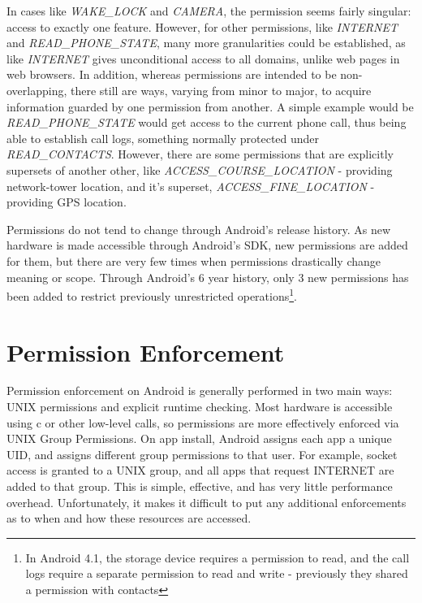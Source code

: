 In cases like \textit{WAKE\_LOCK} and \textit{CAMERA}, the permission seems fairly singular: access to exactly one feature. However, for other permissions, like \textit{INTERNET} and \textit{READ\_PHONE\_STATE}, many more granularities could be established, as like \textit{INTERNET} gives unconditional access to all domains, unlike web pages in web browsers. In addition, whereas permissions are intended to be non-overlapping, there still are ways, varying from minor to major, to acquire information guarded by one permission from another. A simple example would be \textit{READ\_PHONE\_STATE} would get access to the current phone call, thus being able to establish call logs, something normally protected under \textit{READ\_CONTACTS}. However, there are some permissions that are explicitly supersets of another other, like \textit{ACCESS\_COURSE\_LOCATION} - providing network-tower location, and it's superset, \textit{ACCESS\_FINE\_LOCATION} - providing GPS location. 

Permissions do not tend to change through Android's release history. As new hardware is made accessible through Android's SDK, new permissions are added for them, but there are very few times when permissions drastically change meaning or scope. Through Android's 6 year history, only 3 new permissions has been added to restrict previously unrestricted operations\footnote{In Android 4.1, the storage device requires a permission to read, and the call logs require a separate permission to read and write - previously they shared a permission with contacts\citep{android41new}}.

\section{Permission Enforcement}
Permission enforcement on Android is generally performed in two main ways: UNIX permissions and explicit runtime checking. Most hardware is accessible using c or other low-level calls, so permissions are more effectively enforced via UNIX Group Permissions. On app install, Android assigns each app a unique UID, and assigns different group permissions to that user. For example, socket access is granted to a UNIX group, and all apps that request INTERNET are added to that group. This is simple, effective, and has very little performance overhead. Unfortunately, it makes it difficult to put any additional enforcements as to when and how these resources are accessed. 


